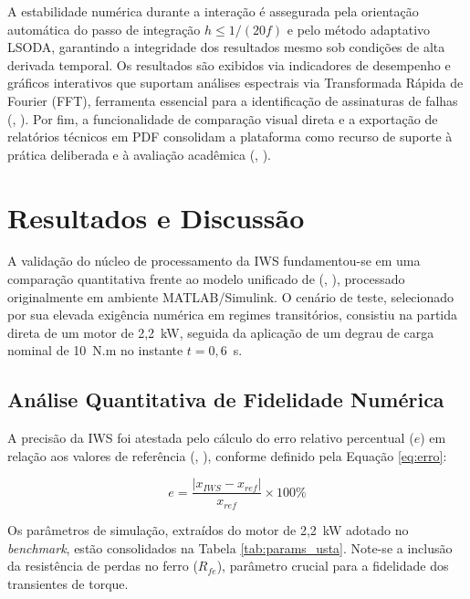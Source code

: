 \documentclass[a4paper]{ifacconf}
\begin{document}
A estabilidade numérica durante a interação é assegurada pela orientação automática do passo de integração $h \leq 1/(20f)$ e pelo método adaptativo LSODA, garantindo a integridade dos resultados mesmo sob condições de alta derivada temporal. Os resultados são exibidos via indicadores de desempenho e gráficos interativos que suportam análises espectrais via Transformada Rápida de Fourier (FFT), ferramenta essencial para a identificação de assinaturas de falhas (\citeauthor{arkan2005modelling}, \citeyear{arkan2005modelling}). Por fim, a funcionalidade de comparação visual direta e a exportação de relatórios técnicos em PDF consolidam a plataforma como recurso de suporte à prática deliberada e à avaliação acadêmica (\citeauthor{singh2019improving}, \citeyear{singh2019improving}).

\section{Resultados e Discussão}

A validação do núcleo de processamento da IWS fundamentou-se em uma comparação quantitativa frente ao modelo unificado de (\citeauthor{usta2024mathematical}, \citeyear{usta2024mathematical}), processado originalmente em ambiente MATLAB/Simulink. O cenário de teste, selecionado por sua elevada exigência numérica em regimes transitórios, consistiu na partida direta de um motor de 2,2~kW, seguida da aplicação de um degrau de carga nominal de 10~N.m no instante $t = 0,6$~s.

\subsection{Análise Quantitativa de Fidelidade Numérica}

A precisão da IWS foi atestada pelo cálculo do erro relativo percentual ($e$) em relação aos valores de referência (\citeauthor{usta2024mathematical}, \citeyear{usta2024mathematical}), conforme definido pela Equação \ref{eq:erro}:

\begin{equation}
e = \frac{|x_{IWS} - x_{ref}|}{x_{ref}} \times 100\%
\label{eq:erro}
\end{equation}

Os parâmetros de simulação, extraídos do motor de 2,2~kW adotado no \textit{benchmark}, estão consolidados na Tabela \ref{tab:params_usta}. Note-se a inclusão da resistência de perdas no ferro ($R_{fe}$), parâmetro crucial para a fidelidade dos transientes de torque.
\end{document}
